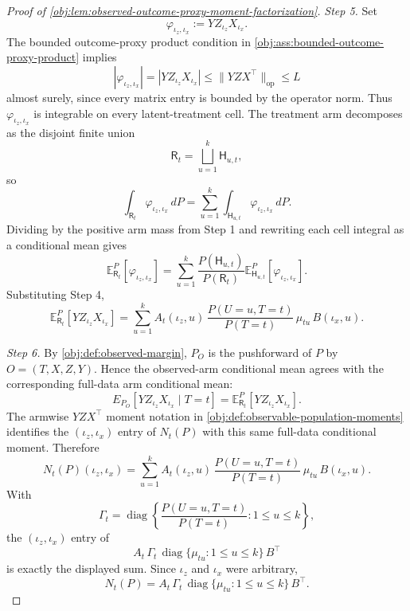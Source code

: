 \begin{proof}[Proof of \cref{obj:lem:observed-outcome-proxy-moment-factorization}]
\emph{Step 5.} Set
\[
\varphi_{\iota_z,\iota_x}:=YZ_{\iota_z}X_{\iota_x}.
\]
The bounded outcome-proxy product condition in \cref{obj:ass:bounded-outcome-proxy-product} implies
\[
|\varphi_{\iota_z,\iota_x}|
=
|YZ_{\iota_z}X_{\iota_x}|
\le
\|YZX^\top\|_{\mathrm{op}}
\le L
\]
almost surely, since every matrix entry is bounded by the operator norm.  Thus \(\varphi_{\iota_z,\iota_x}\) is integrable on every latent-treatment cell.  The treatment arm decomposes as the disjoint finite union
\[
\mathsf R_t=\bigsqcup_{u=1}^{k}\mathsf H_{u,t},
\]
so
\[
\int_{\mathsf R_t}\varphi_{\iota_z,\iota_x}\,dP
=
\sum_{u=1}^{k}\int_{\mathsf H_{u,t}}\varphi_{\iota_z,\iota_x}\,dP .
\]
Dividing by the positive arm mass from Step 1 and rewriting each cell integral as a conditional mean gives
\[
\mathbb E_{\mathsf R_t}^{P}[\varphi_{\iota_z,\iota_x}]
=
\sum_{u=1}^{k}
\frac{P(\mathsf H_{u,t})}{P(\mathsf R_t)}
\mathbb E_{\mathsf H_{u,t}}^{P}[\varphi_{\iota_z,\iota_x}].
\]
Substituting Step 4,
\[
\mathbb E_{\mathsf R_t}^{P}[YZ_{\iota_z}X_{\iota_x}]
=
\sum_{u=1}^{k}
A_t(\iota_z,u)\,
\frac{P(U=u,T=t)}{P(T=t)}\,
\mu_{tu}\,
B(\iota_x,u).
\]

\emph{Step 6.} By \cref{obj:def:observed-margin}, \(P_O\) is the pushforward of \(P\) by \(O=(T,X,Z,Y)\).  Hence the observed-arm conditional mean agrees with the corresponding full-data arm conditional mean:
\[
E_{P_O}\!\left[YZ_{\iota_z}X_{\iota_x}\mid T=t\right]
=
\mathbb E_{\mathsf R_t}^{P}[YZ_{\iota_z}X_{\iota_x}].
\]
The armwise \(YZX^\top\) moment notation in \cref{obj:def:observable-population-moments} identifies the \((\iota_z,\iota_x)\) entry of \(N_t(P)\) with this same full-data conditional moment.  Therefore
\[
N_t(P)(\iota_z,\iota_x)
=
\sum_{u=1}^{k}
A_t(\iota_z,u)\,
\frac{P(U=u,T=t)}{P(T=t)}\,
\mu_{tu}\,
B(\iota_x,u).
\]
With
\[
\Gamma_t
=
\operatorname{diag}\left\{
\frac{P(U=u,T=t)}{P(T=t)}:1\le u\le k
\right\},
\]
the \((\iota_z,\iota_x)\) entry of
\[
A_t\,\Gamma_t\,\operatorname{diag}\{\mu_{tu}:1\le u\le k\}\,B^\top
\]
is exactly the displayed sum.  Since \(\iota_z\) and \(\iota_x\) were arbitrary,
\[
N_t(P)
=
A_t\,\Gamma_t\,\operatorname{diag}\{\mu_{tu}:1\le u\le k\}\,B^\top .
\]
\end{proof}

